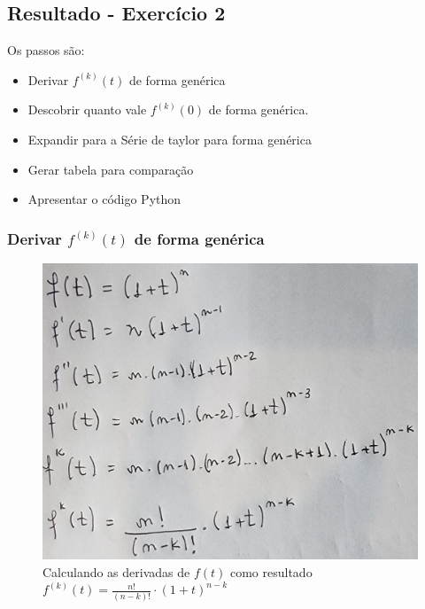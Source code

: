\subsection{Resultado - Exercício 2}

Os passos são:
\begin{itemize}[leftmargin=3.5em, itemsep=-.5mm, topsep=0.5mm]
    \item Derivar $f^{(k)}(t)$ de forma genérica
    \item Descobrir quanto vale $f^{(k)}(0)$ de forma genérica.
    \item Expandir para a Série de taylor para forma genérica
    \item Gerar tabela para comparação
    \item Apresentar o código Python
 \end{itemize}

\subsubsection{Derivar $f^{(k)}(t)$ de forma genérica}

\begin{figure}[H]
    \centering
    \includegraphics[width=1.0\textwidth]{imagens/exercicio2_parte1}
    \caption{Calculando as derivadas de $f(t)$ como resultado $f^{(k)}(t) = \frac{n!}{(n-k)!} \cdot (1 + t)^{n-k}$}
    \label{fig:exe2_parte1}
\end{figure}


